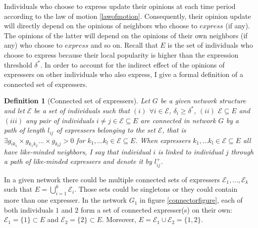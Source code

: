\documentclass{article}
\newtheorem{definition}{Definition}
\begin{document}
Individuals who choose to express update their opinions at each time period according to the law of motion \eqref{lawofmotion}. Consequently, their opinion update will directly depend on the opinions of neighbors who choose to $express$ (if any). The opinions of the latter will depend on the opinions of their own neighbors (if any) who choose to $express$ and so on. Recall that $E$ is the set of individuals who choose to express because their local popularity is higher than the expression threshold $\delta^{*}$. In order to account for the indirect effect of the opinions of expressers on other individuals who also express, I give a formal definition of a connected set of expressers. 

\begin{definition}[Connected set of expressers]
Let $G$ be a given network structure and let $\mathcal{E}$ be a set of individuals such that $(i)$ $\forall i \in \mathcal{E}$, $\delta_i \geq \delta^{*}$, $(ii)$  $\mathcal{E} \subseteq E$  and $(iii)$ any pair of individuals $i \neq j \in \mathcal{E} \subseteq E$ are connected in network $G$ by a path of length $l_{ij}$ of expressers belonging to the set $\mathcal{E}$,  that is $\exists g_{ik_1} \times g_{k_1 k_2} \ldots \times g_{k_l j} >0$ for $k_1, \ldots k_l \in \mathcal{E} \subseteq E$. When expressers $k_1, \ldots k_l \in \mathcal{E} \subseteq E$ all have like-minded neighbors, I say that individual $i$ is linked to individual $j$ through a path of like-minded expressers and denote it by $l_{ij}^{+}$. 
\label{connectedexpressers}
\end{definition}



In a given network there could be multiple connected sets of expressers $\mathcal{E}_1, \ldots, \mathcal{E}_k$ such that $E= \bigcup_{i=1}^{k} \mathcal{E}_i$. Those sets could be singletons or they could contain more than one expresser. In the network $G_{1}$ in figure \ref{connectorfigure}, each of both individuals $1$ and $2$ form a set of connected expresser(s) on their own: $\mathcal{E}_1=\{ 1\} \subset E$ and $\mathcal{E}_2=\{ 2\} \subset E$. Moreover, $E= \mathcal{E}_1 \cup \mathcal{E}_2 = \{ 1,2\}$. \\

\end{document}
